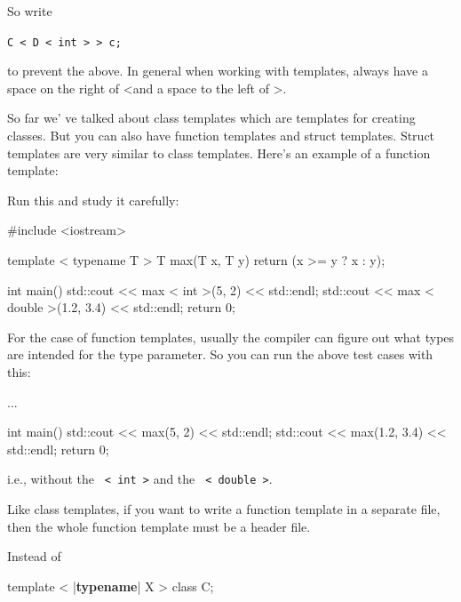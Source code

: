 So write
\begin{center}
\texttt{C < D < int > > c;}
\end{center}
to prevent the above. In general when working with templates, always have a space on the right of \textless and a space to the left of \textgreater.

\newpage{}

So far we' ve talked about class templates which are templates for creating classes. But you can also have function templates and struct templates. Struct templates are very similar to class templates. Here's an example of a function template:

Run this and study it carefully:

\begin{console}
#include <iostream>

template  < typename T >
T max(T x, T y)
{    
     return (x >= y ? x : y);
}

int main()
{    
     std::cout << max < int >(5, 2) << std::endl;
     std::cout << max < double >(1.2, 3.4) << std::endl;
     return 0;
} 
\end{console}

For the case of function templates, usually the compiler can figure out
what types are intended for the type parameter. So you can run the above
test cases with this:

\begin{console}
...

int main()
{    
     std::cout << max(5, 2) << std::endl;
     std::cout << max(1.2, 3.4) << std::endl;
     return 0;
}
\end{console}

i.e., without the \texttt{ < int >} and the \texttt{ < double >}.

Like class templates, if you want to write a function template in a
separate file, then the whole function template must be a header file.




\newpage{}

Instead of

\begin{consolethree}[escapeinside=||]
template  < |\textbf{typename}| X >
class C{}; 
\end{consolethree}

